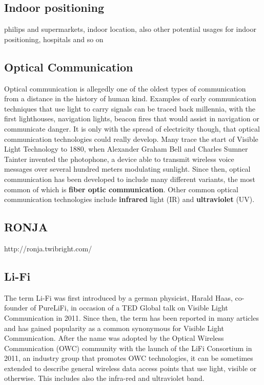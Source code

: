 \subsection{Indoor positioning}
philips and supermarkets, indoor location, also other potential usages for indoor positioning, hospitals and so on

\subsection{Optical Communication}
Optical communication is allegedly one of the oldest types of communication from a distance in the history of human kind.
Examples of early communication techniques that use light to carry signals can be traced back millennia, with the first lighthouses, navigation lights, beacon fires that would assist in navigation or communicate danger.
It is only with the spread of electricity though, that optical communication technologies could really develop.
Many trace the start of Visible Light Technology to 1880, when Alexander Graham Bell and Charles Sumner Tainter invented the photophone, a device able to transmit wireless voice messages over several hundred meters modulating sunlight. 
Since then, optical communication has been developed to include many different variants, the most common  of which is \textbf{fiber optic communication}. 
Other common optical communication technologies include \textbf{infrared} light (IR) and \textbf{ultraviolet} (UV). 

\subsection{RONJA}
http://ronja.twibright.com/

\subsection{Li-Fi}
The term Li-Fi was first introduced by a german physicist, Harald Haas, co-founder of PureLiFi, in occasion of a TED Global talk on Visible Light Communication in 2011. \cite{tedtalk}
Since then, the term has been reported in many articles and has gained popularity as a common synonymous for Visible Light Communication.
After the name was adopted by the Optical Wireless Communication (OWC) community with the launch of the LiFi Consortium in 2011, an industry group that promotes OWC technologies, it can be sometimes extended to describe general wireless data access points that use light, visible or otherwise.
This includes also the infra-red and ultraviolet band.\\

